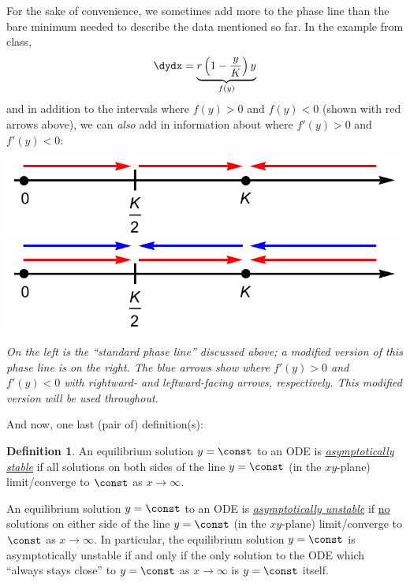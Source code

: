 \documentclass[12pt]{article}
\theoremstyle{definition}
\newtheorem{defn}{Definition}
\theoremstyle{underl}
\newcommand{\capt}[1]{\begin{adjustwidth}{0.5in}{0.5in}\centering\small\textit{#1}\end{adjustwidth}}
\begin{document}
	For the sake of convenience, we sometimes add more to the phase line than the bare minimum needed to describe the data mentioned so far. In the example from class, 
	$$\dydx=\underbrace{r\left(1-\frac{y}{K}\right)y}_{f(y)}$$ 
	and in addition to the intervals where $f(y)>0$ and $f(y)<0$ (shown with red arrows above), we can \textit{also} add in information about where $f'(y)>0$ and $f'(y)<0$:
	\begin{center}
		\includegraphics[align=c,scale=0.675]{AutonomousPhaseLine1}
		\hspace{9mm}
		\includegraphics[align=c,scale=0.675]{AutonomousPhaseLine2}
		\vspace{1.5mm}
		\capt{On the left is the ``standard phase line'' discussed above; a modified version of this phase line is on the right. The blue arrows show where $f'(y)>0$ and $f'(y)<0$ with rightward- and leftward-facing arrows, respectively. This modified version will be used throughout.}
	\end{center}
	\vspace{3mm}
	
	And now, one last (pair of) definition(s):
	
	\begin{defn}
		An equilibrium solution $y=\const$ to an ODE is \ul{\textit{asymptotically stable}} if all solutions on both sides of the line $y=\const$ (in the $xy$-plane) limit/converge to $\const$ as $x\to\infty$.
		
		An equilibrium solution $y=\const$ to an ODE is \ul{\textit{asymptotically unstable}} if \ul{no} solutions on either side of the line $y=\const$ (in the $xy$-plane) limit/converge to $\const$ as $x\to\infty$. In particular, the equilibrium solution $y=\const$ is asymptotically unstable if and only if the only solution to the ODE which ``always stays close'' to $y=\const$ as $x\to\infty$ is $y=\const$ itself.
	\end{defn}
	
\end{document}

